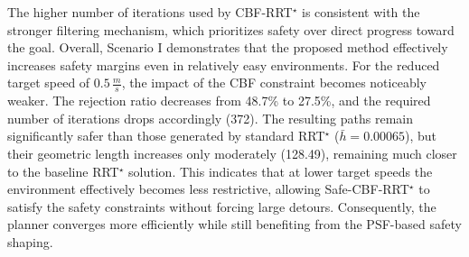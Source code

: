 \documentclass{svproc}
\begin{document}
The higher number of iterations used by CBF-RRT$^\star$ is consistent with
the stronger filtering mechanism, which prioritizes safety over direct
progress toward the goal. Overall, Scenario I demonstrates that the proposed
method effectively increases safety margins even in relatively easy environments.
For the reduced target speed of $0.5\,\frac{m}{s}$, the impact of the CBF
constraint becomes noticeably weaker. The rejection ratio decreases from 48.7\%
to 27.5\%, and the required number of iterations drops accordingly (372). The
resulting paths remain significantly safer than those generated by standard
RRT$^\star$ ($\bar h=0.00065$), but their geometric length increases only
moderately (128.49), remaining much closer to the baseline RRT$^\star$ solution.
This indicates that at lower target speeds the environment effectively becomes
less restrictive, allowing Safe-CBF-RRT$^\star$ to satisfy the safety
constraints without forcing large detours. Consequently, the planner converges
more efficiently while still benefiting from the PSF-based safety shaping.
\end{document}
